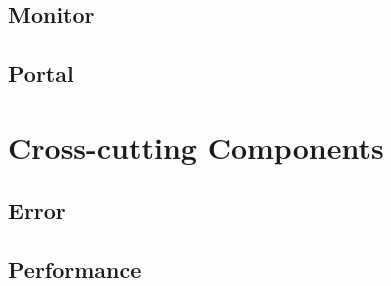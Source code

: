 \documentclass{paper}
\begin{document}
\subsection{Monitor}
\subsection{Portal}
\section{Cross-cutting Components}
\subsection{Error}
\subsection{Performance}
\end{document}
